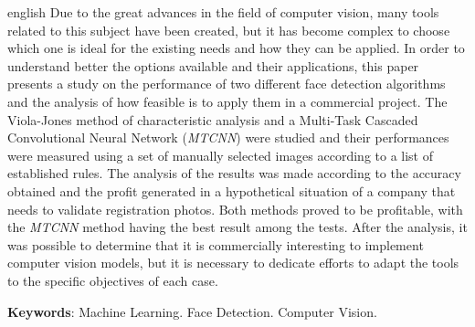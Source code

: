 \begin{resumo}[Abstract]
  \begin{otherlanguage*}{english}
    Due to the great advances in the field of computer vision, many tools related to this subject have been created, but it has become complex to choose which one is ideal for the existing needs and how they can be applied. In order to understand better the options available and their applications, this paper presents a study on the performance of two different face detection algorithms and the analysis of how feasible is to apply them in a commercial project. The Viola-Jones method of characteristic analysis and a Multi-Task Cascaded Convolutional Neural Network (\textit{MTCNN}) were studied and their performances were measured using a set of manually selected images according to a list of established rules. The analysis of the results was made according to the accuracy obtained and the profit generated in a hypothetical situation of a company that needs to validate registration photos. Both methods proved to be profitable, with the \textit{MTCNN} method having the best result among the tests. After the analysis, it was possible to determine that it is commercially interesting to implement computer vision models, but it is necessary to dedicate efforts to adapt the tools to the specific objectives of each case.

    \vspace{\onelineskip}

    \noindent
    \textbf{Keywords}: Machine Learning. Face Detection. Computer Vision.
  \end{otherlanguage*}
\end{resumo}